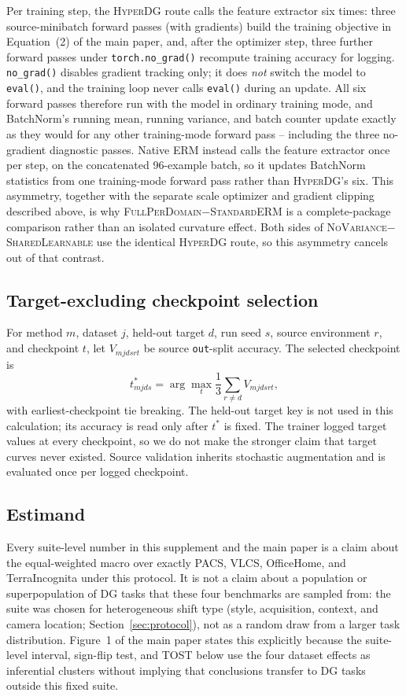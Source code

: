 \documentclass[10pt]{article}
\newcommand{\method}{\textsc{HyperDG}}
\newcommand{\full}{\textsc{FullPerDomain}}
\newcommand{\erm}{\textsc{StandardERM}}
\newcommand{\shared}{\textsc{SharedLearnable}}
\newcommand{\novar}{\textsc{NoVariance}}
\begin{document}
Per training step, the \method{} route calls the feature extractor six times:
three source-minibatch forward passes (with gradients) build the training
objective in Equation~(2) of the main paper, and, after the optimizer step,
three further forward passes under \texttt{torch.no\_grad()} recompute
training accuracy for logging. \texttt{no\_grad()} disables gradient
tracking only; it does \emph{not} switch the model to \texttt{eval()}, and
the training loop never calls \texttt{eval()} during an update. All six
forward passes therefore run with the model in ordinary training mode, and
BatchNorm's running mean, running variance, and batch counter update exactly
as they would for any other training-mode forward pass -- including the three
no-gradient diagnostic passes. Native ERM instead calls the feature extractor
once per step, on the concatenated 96-example batch, so it updates BatchNorm
statistics from one training-mode forward pass rather than \method{}'s six.
This asymmetry, together with the separate scale optimizer and gradient
clipping described above, is why \full{}$-$\erm{} is a complete-package
comparison rather than an isolated curvature effect. Both sides of
\novar{}$-$\shared{} use the identical \method{} route, so this asymmetry
cancels out of that contrast.

\subsection{Target-excluding checkpoint selection}

For method $m$, dataset $j$, held-out target $d$, run seed $s$, source
environment $r$, and checkpoint $t$, let $V_{mjdsrt}$ be source
\texttt{out}-split accuracy. The selected checkpoint is
\begin{equation}
t^*_{mjds}=\arg\max_t\frac{1}{3}\sum_{r\ne d}V_{mjdsrt},
\end{equation}
with earliest-checkpoint tie breaking. The held-out target key is not used in
this calculation; its accuracy is read only after $t^*$ is fixed. The trainer
logged target values at every checkpoint, so we do not make the stronger claim
that target curves never existed. Source validation inherits stochastic
augmentation and is evaluated once per logged checkpoint.

\subsection{Estimand}
\label{sec:estimand}

Every suite-level number in this supplement and the main paper is a claim
about the equal-weighted macro over exactly PACS, VLCS, OfficeHome, and
TerraIncognita under this protocol. It is not a claim about a population or
superpopulation of DG tasks that these four benchmarks are sampled from: the
suite was chosen for heterogeneous shift type (style, acquisition, context,
and camera location; Section~\ref{sec:protocol}), not as a random draw from a
larger task distribution. Figure~1 of the main paper states this explicitly
because the suite-level interval, sign-flip test, and TOST below use the four
dataset effects as inferential clusters without implying that conclusions
transfer to DG tasks outside this fixed suite.
\end{document}
